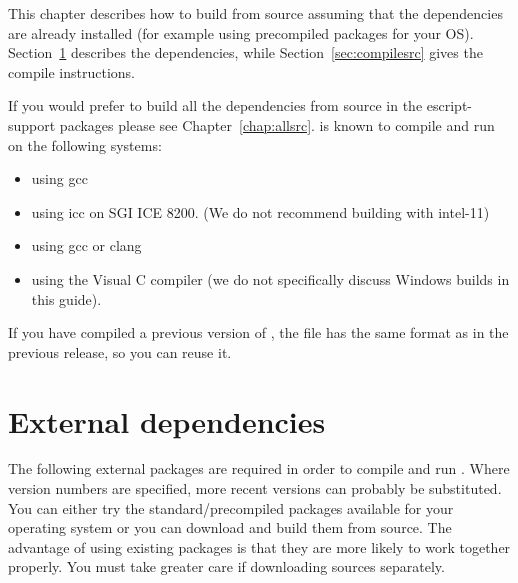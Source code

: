 %
%
%



This chapter describes how to build \esfinley from source assuming that the dependencies are already installed (for example using precompiled packages for your OS).
Section~\ref{sec:deps} describes the dependencies, while Section~\ref{sec:compilesrc} gives the compile instructions.

If you would prefer to build all the dependencies from source in the escript-support packages please see Chapter~\ref{chap:allsrc}.
\esfinley is known to compile and run on the following systems:
\begin{itemize}
 \item \linux using gcc
\item \linux using icc on SGI ICE 8200. (We do not recommend building with intel-11)
\item \macosx using gcc or clang
\item \winxp using the Visual C compiler (we do not specifically discuss Windows builds in this guide).
\end{itemize}

If you have compiled a previous version of \esfinley, the  file has the same format
as in the previous release, so you can reuse it.


\section{External dependencies}
\label{sec:deps}
The following external packages are required in order to compile and run \esfinley.
Where version numbers are specified, more recent versions can probably be substituted.
You can either try the standard/precompiled packages available for your operating system or you can download and build them from source.
The advantage of using existing packages is that they are more likely to work together properly.
You must take greater care if downloading sources separately.

